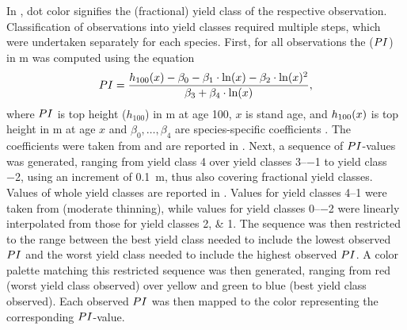 In , dot color signifies the (fractional) yield class of the respective observation.  Classification of observations into yield classes required multiple steps, which were undertaken separately for each species.  First, for all observations the \ProductivityIndexText{} (\(PI{}\)) in \si{\meter} was computed using the equation
\begin{equation}
  \label{eq:NagelFunctionSolvedForProductivityIndex}
  PI{} = \frac{h_{100}{}(x) - \beta_0 - \beta_1 \cdot \ln(x) - \beta_2 \cdot \ln(x)^2 }{\beta_3 + \beta_4 \cdot \ln(x)},
\end{equation}
where \(PI{}\) is top height (\(h_{100}\)) in \si{\meter} at age \SI{100}{\year}, \(x\) is stand age, and \(h_{100}{}(x)\) is top height in \si{\meter} at age \(x\) and \(\beta_0, \ldots, \beta_4\) are species-specific coefficients \parencite{Nagel1999}.  The coefficients were taken from \textcite{Nagel1999} and are reported in .  Next, a sequence of \(PI{}\)-values was generated, ranging from yield class \num{4} over yield classes \numrange{3}{-1} to yield class \num{-2}, using an increment of \SI{0.1}{\meter}, thus also covering fractional yield classes.  Values of whole yield classes are reported in .  Values for yield classes \numrange{4}{1} were taken from \textcite{Schober1995} (moderate thinning), while values for yield classes \numrange{0}{-2} were linearly interpolated from those for yield classes \numlist{2;1}.   The sequence was then restricted to the range between the best yield class needed to include the lowest observed \(PI{}\) and the worst yield class needed to include the highest observed \(PI{}\).  A color palette matching this restricted sequence was then generated, ranging from red (worst yield class observed) over yellow and green to blue (best yield class observed).  Each observed \(PI{}\) was then mapped to the color representing the corresponding \(PI{}\)-value.

